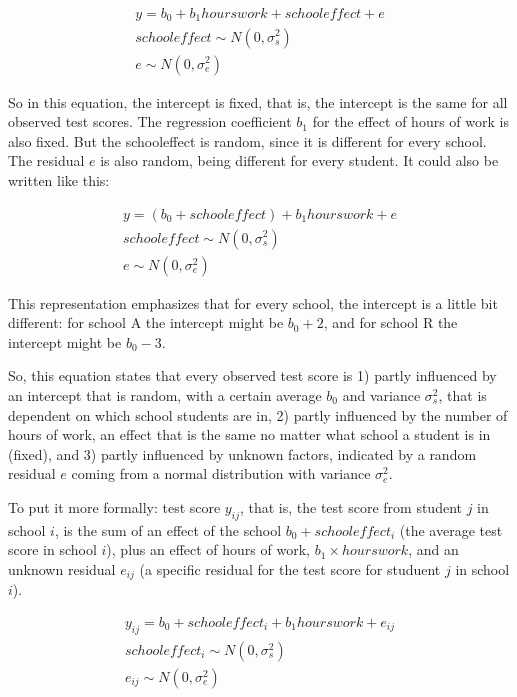 \documentclass[]{report}\usepackage[]{graphicx}\usepackage[]{color}
\begin{document}
\begin{eqnarray}
y = b_0 + b_1 hourswork + schooleffect + e \\
schooleffect \sim N(0, \sigma_s^2)\\
e \sim N(0, \sigma_e^2)
\end{eqnarray}

So in this equation, the intercept is fixed, that is, the intercept is the same for all observed test scores. The regression coefficient $b_1$ for the effect of hours of work is also fixed. But the schooleffect is random, since it is different for every school. The residual $e$ is also random, being different for every student. It could also be written like this:

\begin{eqnarray}
y = (b_0  + schooleffect) + b_1 hourswork + e \\
schooleffect \sim N(0, \sigma_s^2)\\
e \sim N(0, \sigma_e^2)
\end{eqnarray}


This representation emphasizes that for every school, the intercept is a little bit different: for school A the intercept might be $b_0 + 2$, and for school R the intercept might be $b_0 - 3$.

So, this equation states that every observed test score is 1) partly influenced by an intercept that is random, with a certain average $b_0$ and variance $\sigma_s^2$, that is dependent on which school students are in, 2) partly influenced by the number of hours of work, an effect that is the same no matter what school a student is in (fixed), and 3) partly influenced by unknown factors, indicated by a random residual $e$ coming from a normal distribution with variance $\sigma^2_e$.

To put it more formally: test score $y_{ij}$, that is, the test score from student $j$ in school $i$, is the sum of an effect of the school $b_0 + schooleffect_i$ (the average test score in school $i$), plus an effect of hours of work,  $b_1 \times hourswork$, and an unknown residual $e_{ij}$ (a specific residual for the test score for studuent $j$ in school $i$).

\begin{eqnarray}
y_{ij} = b_0 + schooleffect_i + b_1 hourswork + e_{ij} \\
schooleffect_i \sim N(0, \sigma_s^2)\\
e_{ij} \sim N(0, \sigma_e^2)
\end{eqnarray}
\end{document}
